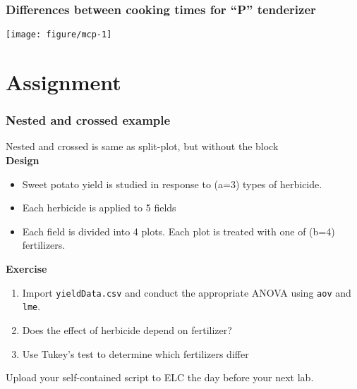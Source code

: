 \documentclass[color=usenames,dvipsnames]{beamer}\usepackage[]{graphicx}\usepackage[]{color}
\newcommand{\inr}[1]{\colorbox{inlinecolor}{\texttt{#1}}}
\begin{document}
\begin{frame}[fragile]
  \frametitle{\small Differences between cooking times for ``P'' tenderizer}
  \centering \footnotesize %

\texttt{[image: figure/mcp-1]} \\
\end{frame}




\section{Assignment}




\begin{frame}[fragile]
  \frametitle{Nested and crossed example}

{%
  \large
  Nested and crossed is same as split-plot, but without the
  block \\}
\pause
\vfill
{\bf Design}
\begin{itemize}%
  \item Sweet potato yield is studied in response to (a=3)
    types of herbicide.
  \item Each herbicide is applied to 5 fields
  \item Each field is divided into 4 plots. Each plot is treated with
    one of (b=4) fertilizers.
\end{itemize}
\pause
\vfill
{\bf Exercise}
\begin{enumerate}[(1)]%
  \item Import {\tt yieldData.csv} and conduct
    the appropriate ANOVA using \inr{aov} and \inr{lme}.
  \item Does the effect of herbicide depend on fertilizer?
  \item Use Tukey's test to determine which fertilizers differ
\end{enumerate}
\vfill
\small
Upload your self-contained script to ELC the day before your next
lab. \\
\end{frame}






\end{document}

